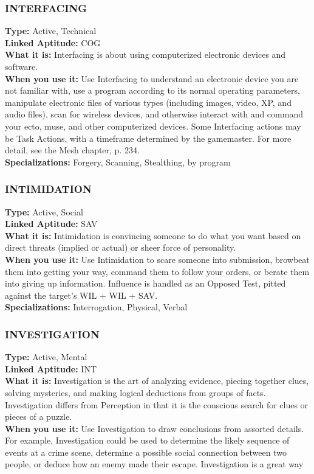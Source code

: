 \subsubsection{INTERFACING} \textbf{Type:} Active, Technical \\ \textbf{Linked Aptitude:} COG \\ \textbf{What it is:} Interfacing is about using computerized electronic devices and software. \\ \textbf{When you use it:} Use Interfacing to understand an electronic device you are not familiar with, use a program according to its normal operating parameters, manipulate electronic files of various types (including images, video, XP, and audio files), scan for wireless devices, and otherwise interact with and command your ecto, muse, and other computerized devices. Some Interfacing actions may be Task Actions, with a timeframe determined by the gamemaster. For more detail, see the Mesh chapter, p. 234. \\ \textbf{Specializations:} Forgery, Scanning, Stealthing, by program 

\subsubsection{INTIMIDATION} \textbf{Type:} Active, Social \\ \textbf{Linked Aptitude:} SAV \\ \textbf{What it is:} Intimidation is convincing someone to do what you want based on direct threats (implied or actual) or sheer force of personality. \\ \textbf{When you use it:} Use Intimidation to scare someone into submission, browbeat them into getting your way, command them to follow your orders, or berate them into giving up information. Influence is handled as an Opposed Test, pitted against the target’s WIL + WIL + SAV. \\ \textbf{Specializations:} Interrogation, Physical, Verbal 

\subsubsection{INVESTIGATION} \textbf{Type:} Active, Mental \\ \textbf{Linked Aptitude:} INT \\ \textbf{What it is:} Investigation is the art of analyzing evidence, piecing together clues, solving mysteries, and making logical deductions from groups of facts. Investigation differs from Perception in that it is the conscious search for clues or pieces of a puzzle. \\ \textbf{When you use it:} Use Investigation to draw conclusions from assorted details. For example, Investigation could be used to determine the likely sequence of events at a crime scene, determine a possible social connection between two people, or deduce how an enemy made their escape. Investigation is a great way 

